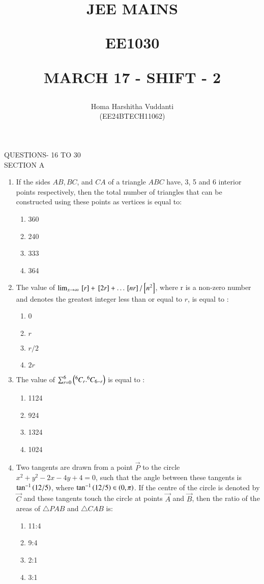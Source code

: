 \documentclass[journal]{IEEEtran}
\begin{document}


\title{
JEE MAINS

\large{EE1030}

MARCH 17 - SHIFT - 2
}
\author{Homa Harshitha Vuddanti

(EE24BTECH11062)
}	

\maketitle

\bigskip

\renewcommand{\thefigure}{\theenumi}
\renewcommand{\thetable}{\theenumi}
QUESTIONS- 16 TO 30\\
SECTION A
\begin{enumerate}
   
\item If the sides $AB, BC$, and $CA$ of a triangle $ABC$ have, 3, 5 and 6 interior points respectively, then the total number of triangles that can be constructed using these points as vertices is equal to:
\begin{enumerate}
    \item 360
    \item 240
    \item 333
    \item 364
\end{enumerate}
 \item The value of $\lim_{x \to \infty}{}\left[r\right]+{}\left[2r\right]+\dots{}\left[nr\right]/{}\left[n^2\right]$, where r is a non-zero number and  denotes the greatest integer less than or equal to $r$, is equal to :
 \begin{enumerate}
     \item 0
     \item $r$
     \item $r/2$
     \item $2r$
 \end{enumerate}
 
 \item The value of $\sum_{r=0}^{6}\left(^6C_r.^6C_{6-r}\right)$ is equal to :
 \begin{enumerate}
     \item 1124
     \item 924
     \item 1324
     \item 1024
 \end{enumerate}
 
\item Two tangents are drawn from a point $\vec{P}$ to the circle $x^2 + y^2 -2x-4y+4=0$, such that the angle between these tangents is  $\tan^{-1}\left(12/5\right)$, where $\tan^{-1}\left(12/5\right)\in \left(0,\pi\right)$. If the centre of the circle is denoted by $\vec{C}$ and these tangents touch the circle at points $\vec{A}$ and $\vec{B}$, then the ratio of the areas of $\triangle PAB$ and $\triangle CAB$ is:
\begin{enumerate}
    \item 11:4
    \item 9:4
    \item 2:1
    \item 3:1
\end{enumerate}


\end{enumerate}
\end{document}
